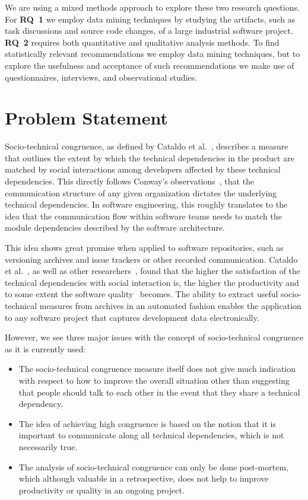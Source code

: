 We are using a mixed methods approach to explore these two research questions.
For \textbf{RQ~1} we employ data mining techniques by studying the artifacts, such as task discussions and source code changes, of a large industrial software project.
\textbf{RQ~2} requires both quantitative and qualitative analysis methods.
To find statistically relevant recommendations we employ data mining techniques, but to explore the usefulness and acceptance of such recommendations we make use of questionnaires, interviews, and observational studies.

\section{Problem Statement}
Socio-technical congruence, as defined by Cataldo et al.~\cite{cataldo:cscw:2006}, describes a measure that outlines the extent by which the technical dependencies in the product are matched by social interactions among developers affected by these technical dependencies.
This directly follows Conway's observations~\cite{conway:datamination:1968}, that the communication structure of any given organization dictates the underlying technical dependencies.
In software engineering, this roughly translates to the idea that the communication flow within software teams needs to match the module dependencies described by the software architecture. 
 
This idea shows great promise when applied to software repositories, such as versioning archives and issue trackers or other recorded communication.
Cataldo et al.~\cite{cataldo:cscw:2006,cataldo:esem:2008}, as well as other researchers~\cite{valetto:msr:2007,ehrlich:stc:2008}, found that the higher the satisfaction of the technical dependencies with social interaction is, the higher the productivity and to some extent the software quality~\cite{kwan:tse:2011,bird:issre:2009,kwan:stc:2009} becomes.
The ability to extract useful socio-technical measures from archives in an automated fashion enables the application to any software project that captures development data electronically.

However, we see three major issues with the concept of socio-technical congruence as it is currently used:
\begin{itemize}
\item The socio-technical congruence measure itself does not give much indication with respect to how to improve the overall situation other than suggesting that people should talk to each other in the event that they share a technical dependency. 
\item The idea of achieving high congruence is based on the notion that it is important to communicate along all technical dependencies, which is not necessarily true.
\item The analysis of socio-technical congruence can only be done post-mortem, which although valuable in a retrospective, does not help to improve productivity or quality in an ongoing project.
\end{itemize}

